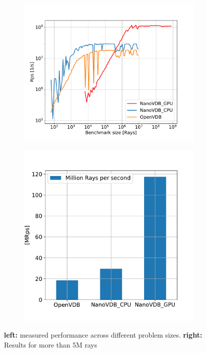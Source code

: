 \begin{figure}[h]
  \begin{subfigure}{0.5\textwidth}
    \includegraphics[width=1\linewidth]{res/results.pdf}

  \end{subfigure}
  \begin{subfigure}{0.4\textwidth}
    \includegraphics[width=1\linewidth]{res/barplot.pdf}
  \end{subfigure}

  \caption{\textbf{left:} measured performance across different problem sizes. \textbf{right:} Results for more than 5M rays}
  \label{fig:results}
\end{figure}


\nocite{openvdb}
\nocite{nanovdb}
